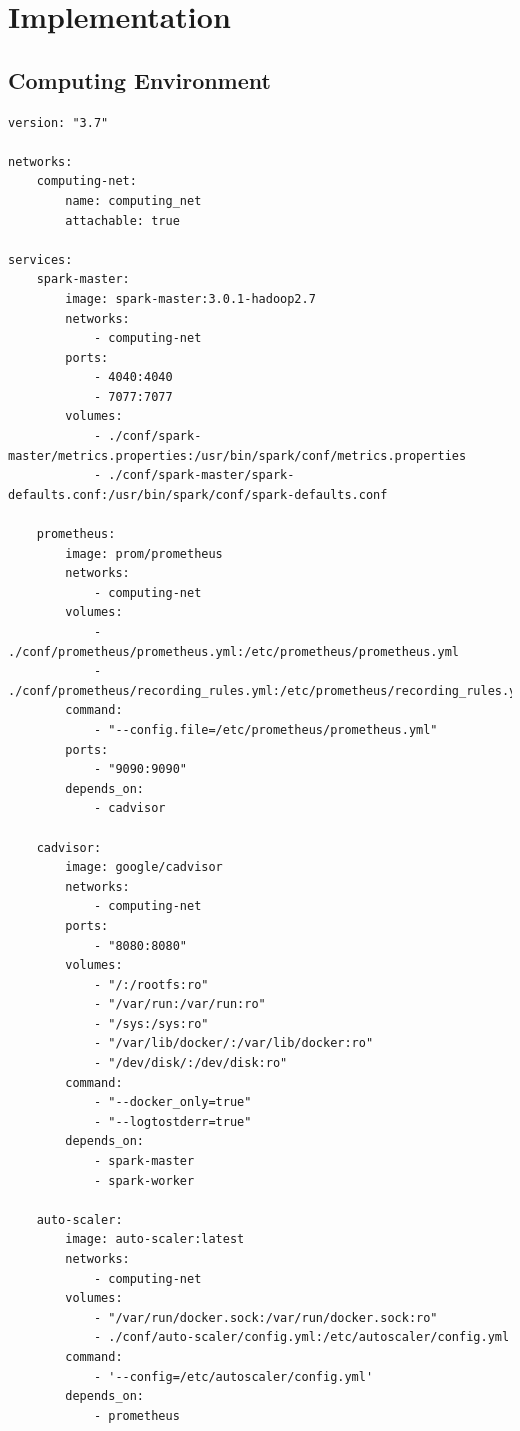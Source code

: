 \chapter{Implementation}

\section{Computing Environment}
\begin{lstlisting}[label=lst:appendix_env_compose, caption=Computing environment docker-compose file]
version: "3.7"
 
networks:
    computing-net:
        name: computing_net
        attachable: true
 
services:
    spark-master:
        image: spark-master:3.0.1-hadoop2.7
        networks:
            - computing-net
        ports:
            - 4040:4040
            - 7077:7077
        volumes:
            - ./conf/spark-master/metrics.properties:/usr/bin/spark/conf/metrics.properties
            - ./conf/spark-master/spark-defaults.conf:/usr/bin/spark/conf/spark-defaults.conf
 
    prometheus:
        image: prom/prometheus
        networks:
            - computing-net
        volumes:
            - ./conf/prometheus/prometheus.yml:/etc/prometheus/prometheus.yml
            - ./conf/prometheus/recording_rules.yml:/etc/prometheus/recording_rules.yml
        command:
            - "--config.file=/etc/prometheus/prometheus.yml"
        ports:
            - "9090:9090"
        depends_on:
            - cadvisor
 
    cadvisor:
        image: google/cadvisor
        networks:
            - computing-net
        ports:
            - "8080:8080"
        volumes:
            - "/:/rootfs:ro"
            - "/var/run:/var/run:ro"
            - "/sys:/sys:ro"
            - "/var/lib/docker/:/var/lib/docker:ro"
            - "/dev/disk/:/dev/disk:ro"
        command:
            - "--docker_only=true"
            - "--logtostderr=true"
        depends_on:
            - spark-master
            - spark-worker
 
    auto-scaler:
        image: auto-scaler:latest
        networks:
            - computing-net
        volumes:
            - "/var/run/docker.sock:/var/run/docker.sock:ro"
            - ./conf/auto-scaler/config.yml:/etc/autoscaler/config.yml
        command:
            - '--config=/etc/autoscaler/config.yml'
        depends_on:
            - prometheus
\end{lstlisting}

